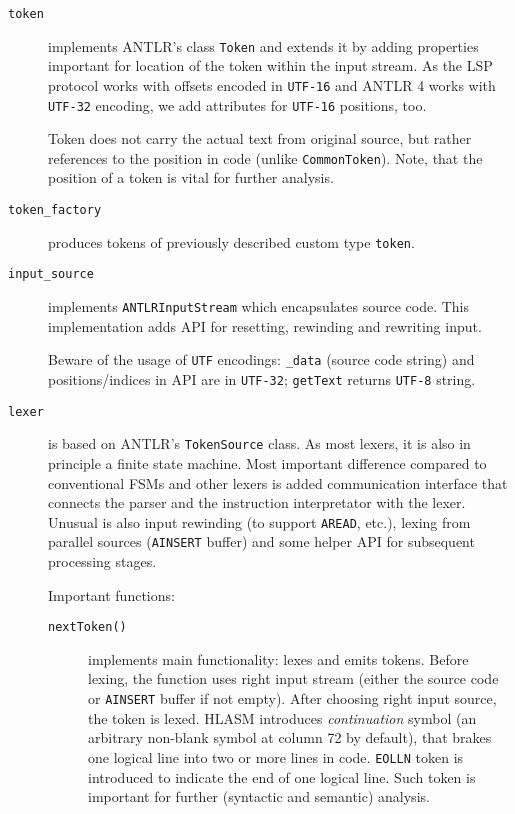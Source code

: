\begin{description}
	
		\item[\texttt{token}] implements ANTLR's class \texttt{Token} and extends it by adding properties important for location of the token within the input stream. As the LSP protocol works with offsets encoded in \texttt{UTF-16} and ANTLR 4 works with \texttt{UTF-32} encoding, we add attributes for \texttt{UTF-16} positions, too.
		
		Token does not carry the actual text from original source, but rather references to the position in code (unlike \texttt{CommonToken}). Note, that the position of a token is vital for further analysis.
		
		\item[\texttt{token\_factory}] produces tokens of previously described custom type \texttt{token}.
		
		\item[\texttt{input\_source}] implements \texttt{ANTLRInputStream} which encapsulates source code. This implementation adds API for resetting, rewinding and rewriting input. 
		
		Beware of the usage of \texttt{UTF} encodings: \texttt{\_data} (source code string) and positions/indices in API are in \texttt{UTF-32}; \texttt{getText} returns \texttt{UTF-8} string.
		
		\item[\texttt{lexer}] is based on ANTLR's \texttt{TokenSource} class. As most lexers, it is also in principle a finite state machine. Most important difference compared to conventional FSMs and other lexers is added communication interface that connects the parser and the instruction interpretator with the lexer. Unusual is also input rewinding (to support \texttt{AREAD}, etc.), lexing from parallel sources (\texttt{AINSERT} buffer) and some helper API for subsequent processing stages.
		
		Important functions:
		
		\begin{description}
			\item[\texttt{nextToken()}] implements main functionality: lexes and emits tokens. Before lexing, the function uses right input stream (either the source code or \texttt{AINSERT} buffer if not empty). After choosing right input source, the token is lexed. HLASM introduces \textit{continuation} symbol (an arbitrary non-blank symbol at column 72 by default), that brakes one logical line into two or more lines in code. \texttt{EOLLN} token is introduced to indicate the end of one logical line. Such token is important for further (syntactic and semantic) analysis.
			

\end{description}
\end{description}

